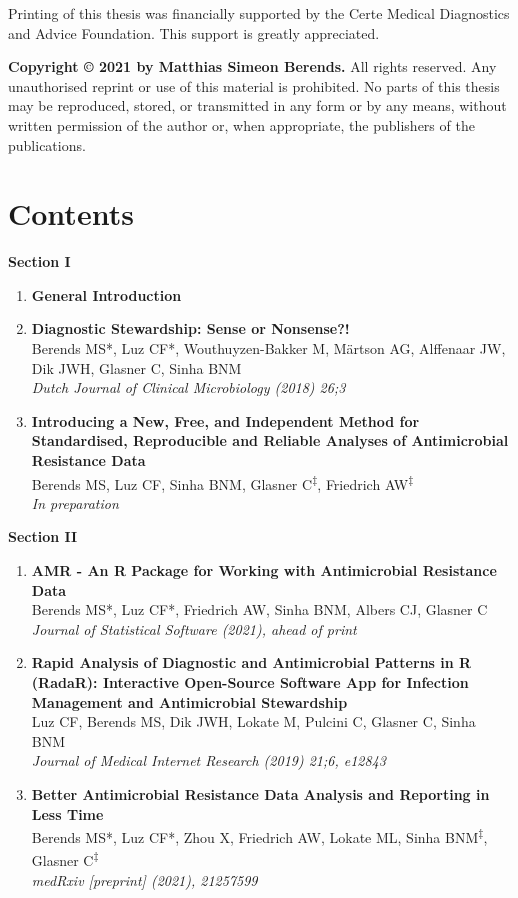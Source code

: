 \documentclass[
]{book}
\begin{document}
Printing of this thesis was financially supported by the Certe Medical Diagnostics and Advice Foundation. This support is greatly appreciated.

\textbf{Copyright © 2021 by Matthias Simeon Berends.} All rights reserved. Any unauthorised reprint or use of this material is prohibited. No parts of this thesis may be reproduced, stored, or transmitted in any form or by any means, without written permission of the author or, when appropriate, the publishers of the publications.

\hypertarget{contents}{%
\chapter*{Contents}\label{contents}}

\textbf{Section I}

\begin{enumerate}
\def\labelenumi{\arabic{enumi}.}
\item
  \textbf{General Introduction}
\item
  \textbf{Diagnostic Stewardship: Sense or Nonsense?!}\\
  Berends MS*, Luz CF*, Wouthuyzen-Bakker M, Märtson AG, Alffenaar JW, Dik JWH, Glasner C, Sinha BNM\\
  \emph{Dutch Journal of Clinical Microbiology (2018) 26;3}
\item
  \textbf{Introducing a New, Free, and Independent Method for Standardised, Reproducible and Reliable Analyses of Antimicrobial Resistance Data}\\
  Berends MS, Luz CF, Sinha BNM, Glasner C\textsuperscript{‡}, Friedrich AW\textsuperscript{‡}\\
  \emph{In preparation}
\end{enumerate}

\textbf{Section II}

\begin{enumerate}
\def\labelenumi{\arabic{enumi}.}
\setcounter{enumi}{3}
\item
  \textbf{AMR - An R Package for Working with Antimicrobial Resistance Data}\\
  Berends MS*, Luz CF*, Friedrich AW, Sinha BNM, Albers CJ, Glasner C\\
  \emph{Journal of Statistical Software (2021), ahead of print}
\item
  \textbf{Rapid Analysis of Diagnostic and Antimicrobial Patterns in R (RadaR): Interactive Open-Source Software App for Infection Management and Antimicrobial Stewardship}\\
  Luz CF, Berends MS, Dik JWH, Lokate M, Pulcini C, Glasner C, Sinha BNM\\
  \emph{Journal of Medical Internet Research (2019) 21;6, e12843}
\item
  \textbf{Better Antimicrobial Resistance Data Analysis and Reporting in Less Time}\\
  Berends MS*, Luz CF*, Zhou X, Friedrich AW, Lokate ML, Sinha BNM\textsuperscript{‡}, Glasner C\textsuperscript{‡}\\
  \emph{medRxiv {[}preprint{]} (2021), 21257599}
\end{enumerate}
\end{document}
